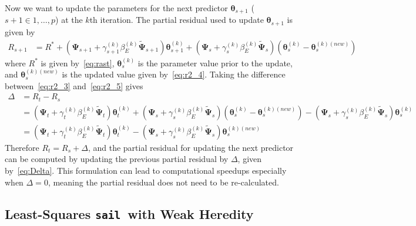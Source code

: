 \documentclass[12pt,letter]{article}\usepackage[]{graphicx}\usepackage[]{color}
\newcommand{\sail}{\texttt{sail}}
\newcommand{\btheta}{\boldsymbol{\theta}}
\newcommand{\bPsi}{\boldsymbol{\Psi}}
\begin{document}
Now we want to update the parameters for the next predictor $\btheta_{s+1}$ ($s+1 \in {1,\ldots, p}$) at the $k$th iteration. The partial residual used to update $\btheta_{s+1}$ is given by
\begin{align}
R_{s+1} & = R^\ast + (\bPsi_{s+1} + \gamma_{s+1}^{(k)}\beta_E^{(k)} \widetilde{\bPsi}_{s+1})\btheta_{s+1}^{(k)} + (\bPsi_s + \gamma_s^{(k)}\beta_E^{(k)} \widetilde{\bPsi}_s)(\btheta_s^{(k)} - \btheta_s^{(k)(new)}) \label{eq:r2_5} 
\end{align}
where $R^\ast$ is given by~\eqref{eq:rast}, $\btheta_s^{(k)}$ is the parameter value prior to the update, and $\btheta_s^{(k)(new)}$ is the updated value given by~\eqref{eq:r2_4}. Taking the difference between~\eqref{eq:r2_3} and~\eqref{eq:r2_5} gives
\begin{align}
\Delta & = R_t - R_s \nonumber\\
& = (\bPsi_t + \gamma_t^{(k)}\beta_E^{(k)} \widetilde{\bPsi}_t)\btheta_t^{(k)} + (\bPsi_s + \gamma_s^{(k)}\beta_E^{(k)} \widetilde{\bPsi}_s)(\btheta_s^{(k)} - \btheta_s^{(k)(new)}) - (\bPsi_s + \gamma_s^{(k)}\beta_E^{(k)} \widetilde{\bPsi}_s)\btheta_s^{(k)} \nonumber\\
& = (\bPsi_t + \gamma_t^{(k)}\beta_E^{(k)} \widetilde{\bPsi}_t)\btheta_t^{(k)} - (\bPsi_s + \gamma_s^{(k)}\beta_E^{(k)} \widetilde{\bPsi}_s)\btheta_s^{(k)(new)} \label{eq:Delta}
\end{align} 
Therefore $R_t = R_s + \Delta$, and the partial residual for updating the next predictor can be computed by updating the previous partial residual by $\Delta$, given by~\eqref{eq:Delta}. This formulation can lead to computational speedups especially when $\Delta = 0$, meaning the partial residual does not need to be re-calculated.  



\subsection{Least-Squares \sail ~with Weak Heredity} \label{ap:subsec:lssailweak}
\end{document}
